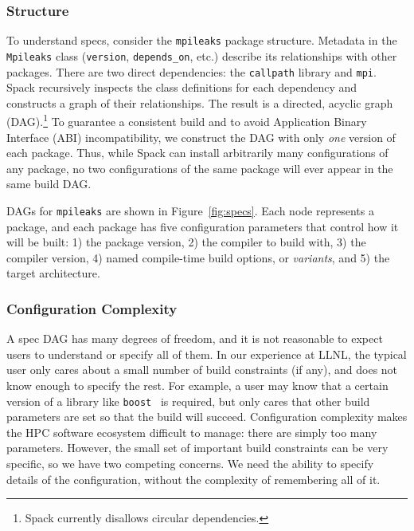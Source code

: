 \subsubsection{Structure}
To understand specs, consider the {\tt mpileaks} package structure.
Metadata in the {\tt Mpileaks} class ({\tt version}, {\tt depends\_on}, etc.) describe
its relationships with other packages.  There are two direct dependencies:
the {\tt callpath} library and {\tt mpi}.  Spack recursively inspects the class definitions
for each dependency and constructs a graph of their relationships.  The result
is a directed, acyclic graph (DAG).\footnote{Spack currently disallows
circular dependencies.}
%
To guarantee a consistent build and to avoid
Application Binary Interface (ABI) incompatibility, we construct
the DAG with only {\it one} version of each package.  Thus, while
Spack can install arbitrarily many configurations of any package,
no two configurations of the same package will ever appear in the same build DAG.

DAGs for {\tt mpileaks} are shown in Figure~\ref{fig:specs}.
Each node represents a package, and each package has five configuration parameters that control
how it will be built: 1) the package version, 2) the compiler to
build with, 3) the compiler version, 4) named compile-time build options, or {\it variants},
and 5) the target architecture.


\subsubsection{Configuration Complexity}
A spec DAG has many degrees of freedom, and it is not reasonable to expect users to
understand or specify all of them.  In our experience at LLNL, the typical user
only cares about a small number of build constraints (if any), and does not know enough to
specify the rest. For example, a user may know that a certain version of a library like
{\tt boost}~\cite{boost} is required, but only cares that other build parameters are set so that
the build will succeed.
%
Configuration complexity makes the HPC software ecosystem difficult to manage: there are
simply too many parameters. However, the small set of important build constraints can be
very specific, so we have two competing concerns.  We need the ability to specify details
of the configuration, without the complexity of remembering all of it.


